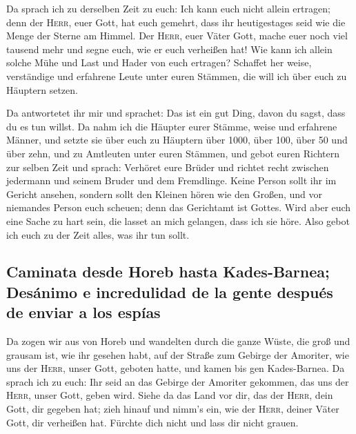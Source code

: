  Da sprach ich zu derselben Zeit zu euch: Ich kann euch
nicht allein ertragen;  denn der \textsc{Herr}, euer
Gott, hat euch gemehrt, dass ihr heutigestages seid wie die Menge der
Sterne am Himmel.  Der \textsc{Herr}, euer Väter Gott,
mache euer noch viel tausend mehr und segne euch, wie er euch verheißen
hat!  Wie kann ich allein solche Mühe und Last und Hader
von euch ertragen?  Schaffet her weise, verständige und
erfahrene Leute unter euren Stämmen, die will ich über euch zu Häuptern
setzen.

 Da antwortetet ihr mir und sprachet: Das ist ein gut
Ding, davon du sagst, dass du es tun willst.  Da nahm ich
die Häupter eurer Stämme, weise und erfahrene Männer, und setzte sie
über euch zu Häuptern über 1000, über 100, über 50 und über zehn, und zu
Amtleuten unter euren Stämmen,  und gebot euren Richtern
zur selben Zeit und sprach: Verhöret eure Brüder und richtet recht
zwischen jedermann und seinem Bruder und dem Fremdlinge. 
Keine Person sollt ihr im Gericht ansehen, sondern sollt den Kleinen
hören wie den Großen, und vor niemandes Person euch scheuen; denn das
Gerichtamt ist Gottes. Wird aber euch eine Sache zu hart sein, die
lasset an mich gelangen, dass ich sie höre.  Also gebot
ich euch zu der Zeit alles, was ihr tun sollt.

\hypertarget{caminata-desde-horeb-hasta-kades-barnea-desuxe1nimo-e-incredulidad-de-la-gente-despuuxe9s-de-enviar-a-los-espuxedas}{%
\subsection{Caminata desde Horeb hasta Kades-Barnea; Desánimo e
incredulidad de la gente después de enviar a los
espías}\label{caminata-desde-horeb-hasta-kades-barnea-desuxe1nimo-e-incredulidad-de-la-gente-despuuxe9s-de-enviar-a-los-espuxedas}}

 Da zogen wir aus von Horeb und wandelten durch die ganze
Wüste, die groß und grausam ist, wie ihr gesehen habt, auf der Straße
zum Gebirge der Amoriter, wie uns der \textsc{Herr}, unser Gott, geboten
hatte, und kamen bis gen Kades-Barnea.  Da sprach ich zu
euch: Ihr seid an das Gebirge der Amoriter gekommen, das uns der
\textsc{Herr}, unser Gott, geben wird.  Siehe da das Land
vor dir, das der \textsc{Herr}, dein Gott, dir gegeben hat; zieh hinauf
und nimm's ein, wie der \textsc{Herr}, deiner Väter Gott, dir verheißen
hat. Fürchte dich nicht und lass dir nicht grauen.

